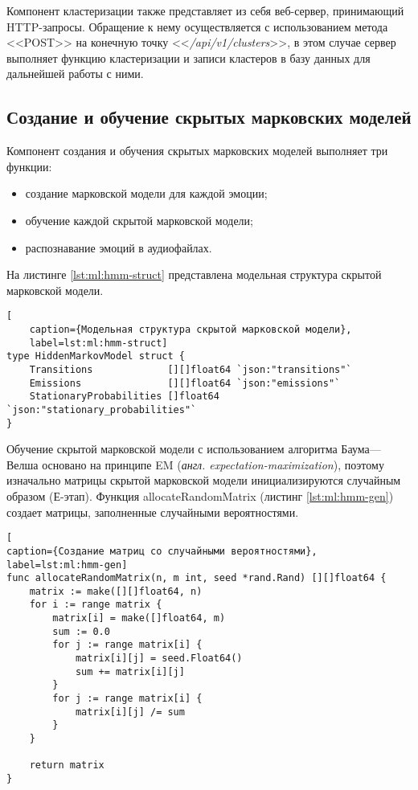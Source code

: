 Компонент кластеризации также представляет из себя веб-сервер, принимающий HTTP-запросы. Обращение к нему осуществляется с использованием метода <<POST>> на конечную точку <<\textit{/api/v1/clusters}>>, в этом случае сервер выполняет функцию кластеризации и записи кластеров в базу данных для дальнейшей работы с ними.

\subsection{Создание и обучение скрытых марковских моделей}
Компонент создания и обучения скрытых марковских моделей выполняет три функции:
\begin{itemize}
	\item создание марковской модели для каждой эмоции;
	\item обучение каждой скрытой марковской модели;
	\item распознавание эмоций в аудиофайлах.
\end{itemize}
На листинге \ref{lst:ml:hmm-struct} представлена модельная структура скрытой марковской модели.
\begin{lstlisting}[
	caption={Модельная структура скрытой марковской модели},
	label=lst:ml:hmm-struct]
type HiddenMarkovModel struct {
    Transitions             [][]float64 `json:"transitions"`
    Emissions               [][]float64 `json:"emissions"`
    StationaryProbabilities []float64   `json:"stationary_probabilities"`
}
\end{lstlisting}
Обучение скрытой марковской модели с использованием алгоритма Баума---Велша основано на принципе EM (\textit{англ. expectation-maximization}), поэтому изначально матрицы скрытой марковской модели инициализируются случайным образом (Е-этап). Функция allocateRandomMatrix (листинг \ref{lst:ml:hmm-gen}) создает матрицы, заполненные случайными вероятностями.
\begin{lstlisting}[
caption={Создание матриц со случайными вероятностями},
label=lst:ml:hmm-gen]
func allocateRandomMatrix(n, m int, seed *rand.Rand) [][]float64 {
	matrix := make([][]float64, n)
	for i := range matrix {
		matrix[i] = make([]float64, m)
		sum := 0.0
		for j := range matrix[i] {
			matrix[i][j] = seed.Float64()
			sum += matrix[i][j]
		}
		for j := range matrix[i] {
			matrix[i][j] /= sum
		}
	}
	
	return matrix
}
\end{lstlisting}



